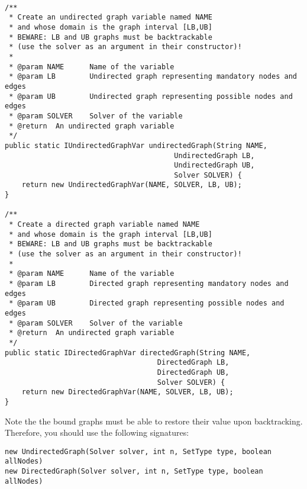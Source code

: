 \documentclass{doc}
\begin{document}
\lstset{language=Java} 

 

\begin{lstlisting}

/**
 * Create an undirected graph variable named NAME
 * and whose domain is the graph interval [LB,UB]
 * BEWARE: LB and UB graphs must be backtrackable 
 * (use the solver as an argument in their constructor)!
 *
 * @param NAME		Name of the variable
 * @param LB		Undirected graph representing mandatory nodes and edges
 * @param UB		Undirected graph representing possible nodes and edges
 * @param SOLVER	Solver of the variable
 * @return	An undirected graph variable
 */
public static IUndirectedGraphVar undirectedGraph(String NAME, 
										UndirectedGraph LB, 
										UndirectedGraph UB, 
										Solver SOLVER) {
	return new UndirectedGraphVar(NAME, SOLVER, LB, UB);
}

/**
 * Create a directed graph variable named NAME
 * and whose domain is the graph interval [LB,UB]
 * BEWARE: LB and UB graphs must be backtrackable 
 * (use the solver as an argument in their constructor)!
 *
 * @param NAME		Name of the variable
 * @param LB		Directed graph representing mandatory nodes and edges
 * @param UB		Directed graph representing possible nodes and edges
 * @param SOLVER	Solver of the variable
 * @return	An undirected graph variable
 */
public static IDirectedGraphVar directedGraph(String NAME, 
									DirectedGraph LB, 
									DirectedGraph UB, 
									Solver SOLVER) {
	return new DirectedGraphVar(NAME, SOLVER, LB, UB);
}
\end{lstlisting}

Note the the bound graphs must be able to restore their value upon backtracking. 
Therefore, you should use the following signatures:
\begin{lstlisting}
new UndirectedGraph(Solver solver, int n, SetType type, boolean allNodes)
new DirectedGraph(Solver solver, int n, SetType type, boolean allNodes)
\end{lstlisting}
\end{document}
